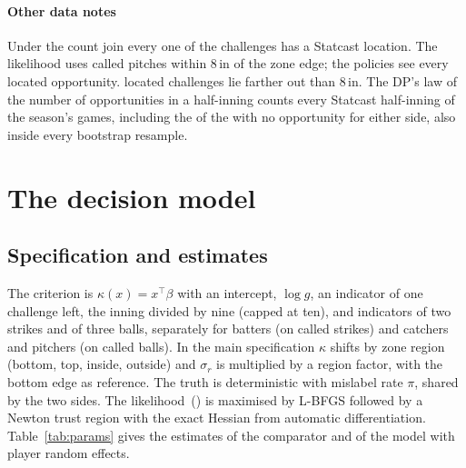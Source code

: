 \documentclass[aoas]{imsart}
\theoremstyle{plain}
\theoremstyle{definition}
\begin{document}
\paragraph{Other data notes} Under the count join every one of the \NChallenges{} challenges has a Statcast
location. The likelihood uses called pitches within 8\,in of the zone edge; the policies see every located
opportunity. \SBeyondEight{} located challenges lie farther out than 8\,in. The DP's law of the number of
opportunities in a half-inning counts every Statcast half-inning of the season's games, including the \NHalvesZero{}
of the \NHalvesAll{} with no opportunity for either side, also inside every bootstrap resample.

\section{The decision model}\label{sec:perception}

\subsection{Specification and estimates}
The criterion is $\kappa(x)=x^\top\beta$ with an intercept, $\log g$, an indicator of one challenge left, the inning
divided by nine (capped at ten), and indicators of two strikes and of three balls, separately for batters (on called
strikes) and catchers and pitchers (on called balls). In the main specification $\kappa$ shifts by zone region (bottom,
top, inside, outside) and $\sigma_r$ is multiplied by a region factor, with the bottom edge as reference. The truth is
deterministic with mislabel rate $\pi$, shared by the two sides. The likelihood~()
is maximised by L-BFGS followed by a Newton trust region with the exact Hessian from automatic differentiation.
Table~\ref{tab:params} gives the estimates of the comparator and of the model with player random effects.

\begin{table}[!htbp]
\caption{Estimates of the main decision model and of the primary model with player random effects
$(\kappa_i,\log\sigma_{r,i})$ and a lapse rate, the effects bivariate normal per side and integrated by Gauss--Hermite
quadrature with $11\times11$ nodes (against $5\times5$ the log-likelihood improves by \REGHDLL, $\sigma_r$ moves by at
most \REGHSrPct\% and the SD of the batters' criterion from \REGHSdKFive{} to \REGHSdKEleven\,in). Distances in
inches.}\label{tab:params}
\centering\small

\end{table}
\end{document}
